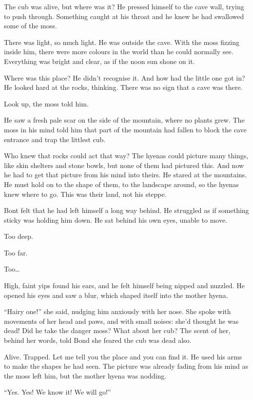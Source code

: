The cub was alive, but where was it? He pressed himself to the cave wall, trying to push through. Something caught at his throat and he knew he had swallowed some of the moss.

There was light, so much light. He was outside the cave. With the moss fizzing inside him, there were more colours in the world than he could normally see. Everything was bright and clear, as if the noon sun shone on it.

Where was this place? He didn't recognise it. And how had the little one got in? He looked hard at the rocks, thinking. There was no sign that a cave was there.

Look up, the moss told him.

He saw a fresh pale scar on the side of the mountain, where no plants grew. The moss in his mind told him that part of the mountain had fallen to block the cave entrance and trap the littlest cub.

Who knew that rocks could act that way? The hyenas could picture many things, like skin shelters and stone bowls, but none of them had pictured this. And now he had to get that picture from his mind into theirs. He stared at the mountains. He must hold on to the shape of them, to the landscape around, so the hyenas knew where to go. This was their land, not his steppe.

Bont felt that he had left himself a long way behind. He struggled as if something sticky was holding him down. He sat behind his own eyes, unable to move.

Too deep.

Too far.

Too\ldots{}

High, faint yips found his ears, and he felt himself being nipped and nuzzled. He opened his eyes and saw a blur, which shaped itself into the mother hyena.

``Hairy one!'' she said, nudging him anxiously with her nose. She spoke with movements of her head and paws, and with small noises: she'd thought he was dead! Did he take the danger moss? What about her cub? The scent of her, behind her words, told Bond she feared the cub was dead also.

Alive. Trapped. Let me tell you the place and you can find it. He used his arms to make the shapes he had seen. The picture was already fading from his mind as the moss left him, but the mother hyena was nodding.

``Yes. Yes! We know it! We will go!''

